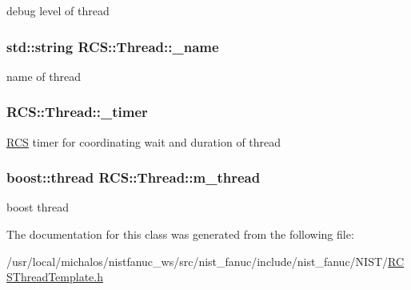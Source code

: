debug level of thread \hypertarget{classRCS_1_1Thread_a665a238614304950e1c19e7d03e236e1}{
\subsubsection[{\-\_\-name}]{\setlength{\rightskip}{0pt plus 5cm}std\-::string R\-C\-S\-::\-Thread\-::\-\_\-name\hspace{0.3cm}{\ttfamily [protected]}}}\label{classRCS_1_1Thread_a665a238614304950e1c19e7d03e236e1}
name of thread \hypertarget{classRCS_1_1Thread_afddbc109781286f80017468dcccc6b10}{
\subsubsection[{\-\_\-timer}]{ R\-C\-S\-::\-Thread\-::\-\_\-timer\hspace{0.3cm}{\ttfamily [protected]}}}\label{classRCS_1_1Thread_afddbc109781286f80017468dcccc6b10}
\hyperlink{namespaceRCS}{R\-C\-S} timer for coordinating wait and duration of thread \hypertarget{classRCS_1_1Thread_a06b98cfbb4d084f3776ad0ab8731a60a}{
\subsubsection[{m\-\_\-thread}]{\setlength{\rightskip}{0pt plus 5cm}boost\-::thread R\-C\-S\-::\-Thread\-::m\-\_\-thread\hspace{0.3cm}{\ttfamily [protected]}}}\label{classRCS_1_1Thread_a06b98cfbb4d084f3776ad0ab8731a60a}
boost thread 

The documentation for this class was generated from the following file\-:\begin{DoxyCompactItemize}
\item 
/usr/local/michalos/nistfanuc\-\_\-ws/src/nist\-\_\-fanuc/include/nist\-\_\-fanuc/\-N\-I\-S\-T/\hyperlink{RCSThreadTemplate_8h}{R\-C\-S\-Thread\-Template.\-h}\end{DoxyCompactItemize}
